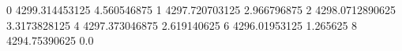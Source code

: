 0 4299.314453125 4.560546875
1 4297.720703125 2.966796875
2 4298.0712890625 3.3173828125
4 4297.373046875 2.619140625
6 4296.01953125 1.265625
8 4294.75390625 0.0
